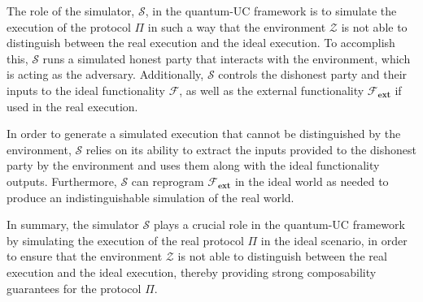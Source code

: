 The role of the simulator, $\mathcal{S}$, in the quantum-UC framework is to simulate the execution of the protocol $\Pi$ in such a way that the environment $\mathcal{Z}$ is not able to distinguish between the real execution and the ideal execution. To accomplish this, $\mathcal{S}$ runs a simulated honest party that interacts with the environment, which is acting as the adversary. Additionally, $\mathcal{S}$ controls the dishonest party and their inputs to the ideal functionality $\mathcal{F}$, as well as the external functionality $\mathcal{F}_{\textbf{ext}}$ if used in the real execution.

In order to generate a simulated execution that cannot be distinguished by the environment, $\mathcal{S}$ relies on its ability to extract the inputs provided to the dishonest party by the environment and uses them along with the ideal functionality outputs. Furthermore, $\mathcal{S}$ can reprogram $\mathcal{F}_{\textbf{ext}}$ in the ideal world as needed to produce an indistinguishable simulation of the real world.

In summary, the simulator $\mathcal{S}$ plays a crucial role in the quantum-UC framework by simulating the execution of the real protocol $\Pi$ in the ideal scenario, in order to ensure that the environment $\mathcal{Z}$ is not able to distinguish between the real execution and the ideal execution, thereby providing strong composability guarantees for the protocol $\Pi$.




 

